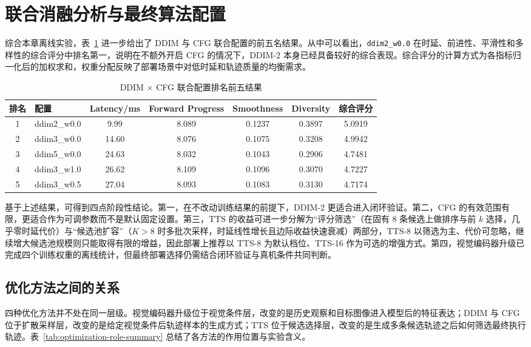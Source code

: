 \section{联合消融分析与最终算法配置}

综合本章离线实验，表~\ref{tab:joint-ddim-cfg} 进一步给出了 DDIM 与 CFG 联合配置的前五名结果。从中可以看出，\texttt{ddim2\_w0.0} 在时延、前进性、平滑性和多样性的综合评分中排名第一，说明在不额外开启 CFG 的情况下，DDIM-2 本身已经具备较好的综合表现。综合评分的计算方式为各指标归一化后的加权求和，权重分配反映了部署场景中对低时延和轨迹质量的均衡需求。

\begin{table}[htbp]
    \centering
    \caption{DDIM $\times$ CFG 联合配置排名前五结果}
    \label{tab:joint-ddim-cfg}
    \begin{tabular}{clccccc}
        \toprule
        排名 & 配置 & Latency/ms & Forward Progress & Smoothness & Diversity & 综合评分 \\
        \midrule
        1 & ddim2\_w0.0 & 9.99 & 8.089 & 0.1237 & 0.3897 & 5.0919 \\
        2 & ddim3\_w0.0 & 14.60 & 8.076 & 0.1075 & 0.3208 & 4.9942 \\
        3 & ddim5\_w0.0 & 24.63 & 8.032 & 0.1043 & 0.2906 & 4.7481 \\
        4 & ddim3\_w1.0 & 26.62 & 8.109 & 0.1096 & 0.3070 & 4.7227 \\
        5 & ddim3\_w0.5 & 27.04 & 8.093 & 0.1083 & 0.3130 & 4.7174 \\
        \bottomrule
    \end{tabular}
\end{table}

基于上述结果，可得到四点阶段性结论。第一，在不改动训练结果的前提下，DDIM-2 更适合进入闭环验证。第二，CFG 的有效范围有限，更适合作为可调参数而不是默认固定设置。第三，TTS 的收益可进一步分解为``评分筛选''（在固有 8 条候选上做排序与前 $k$ 选择，几乎零时延代价）与``候选池扩容''（$K>8$ 时多批次采样，时延线性增长且边际收益快速衰减）两部分，TTS-8 以筛选为主、代价可忽略，继续增大候选池规模则只能取得有限的增益，因此部署上推荐以 TTS-8 为默认档位、TTS-16 作为可选的增强方式。第四，视觉编码器升级已完成四个训练权重的离线统计，但最终部署选择仍需结合闭环验证与真机条件共同判断。

\subsection{优化方法之间的关系}

四种优化方法并不处在同一层级。视觉编码器升级位于视觉条件层，改变的是历史观察和目标图像进入模型后的特征表达；DDIM 与 CFG 位于扩散采样层，改变的是给定视觉条件后轨迹样本的生成方式；TTS 位于候选选择层，改变的是生成多条候选轨迹之后如何筛选最终执行轨迹。表~\ref{tab:optimization-role-summary} 总结了各方法的作用位置与实验含义。

